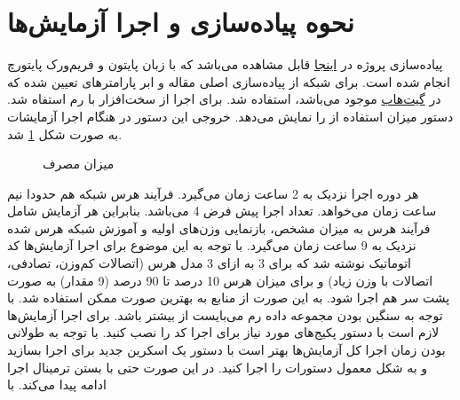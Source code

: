 \section{نحوه پیاده‌سازی و اجرا آزمایش‌ها}
پیاده‌سازی پروژه در 
\href{https://github.com/ghazaleh-mahmoodi/LXMERT-Compression}{اینجا}
قابل مشاهده می‌باشد که با زبان پایتون و فریم‌ورک پایتورچ انجام شده است. برای شبکه 
از پیاده‌سازی اصلی مقاله و ابر پارامتر‌های تعیین شده که در 
\href{https://github.com/airsplay/lxmert}{گیت‌هاب}
موجود می‌باشد، استفاده شد.
\newline
برای اجرا از سخت‌افزار
با رم 
استفاه شد. دستور 
میزان استفاده از 
را نمایش می‌دهد. خروجی این دستور در هنگام اجرا آزمایشات به صورت شکل \ref{nvidia-smi} شد.
\begin{figure}[H]		  		    
	\caption{میزان مصرف
}
	\label{nvidia-smi}
\end{figure}
هر دوره
اجرا نزدیک به 2 ساعت زمان می‌گیرد. فرآیند هرس شبکه هم حدودا نیم ساعت زمان می‌خواهد. تعداد اجرا پیش فرض 4 می‌باشد. بنابراین هر آزمایش شامل فرآیند هرس به میزان مشخص، بازنمایی
 وزن‌های اولیه و آموزش شبکه هرس شده نزدیک به 9 ساعت زمان می‌گیرد. با توجه به این موضوع برای اجرا آزمایش‌ها کد اتوماتیک نوشته شد که برای 3 
به ازای 3 مدل هرس (اتصالات کم‌وزن، تصادفی، اتصالات با وزن زیاد) و برای میزان هرس 10 درصد تا 90 درصد (9 مقدار) به صورت پشت سر هم اجرا شود. به این صورت از منابع 
به بهترین صورت ممکن استفاده شد.
با توجه به سنگین بودن مجموعه داده 
رم
می‌بایست از 
بیشتر باشد. 
\newline
\newline
برای اجرا آزمایش‌ها لازم است با دستور 
پکیج‌های مورد نیاز برای اجرا کد را نصب کنید. با توجه به طولانی بودن زمان اجرا کل آزمایش‌ها بهتر است با دستور 
یک اسکرین جدید برای اجرا بسازید و به شکل معمول دستورات را اجرا کنید. در این صورت حتی با بستن ترمینال اجرا ادامه پیدا می‌کند. با
